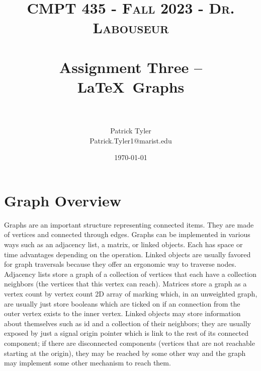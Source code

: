 \documentclass[letterpaper, 10pt]{article}
\title{	
   \normalfont \normalsize 
   \textsc{CMPT 435 - Fall 2023 - Dr. Labouseur} \\[10pt] %
   \horrule{0.5pt} \\[0.25cm] 	%
   \huge Assignment Three -- \LaTeX ~Graphs\\     	    %
   \horrule{0.5pt} \\[0.25cm] 	%
}
\author{Patrick Tyler \\ \normalsize Patrick.Tyler1@marist.edu}
\date{\normalsize\today} 	%
\begin{document}
\maketitle %
\section{Graph Overview}
Graphs are an important structure representing connected items. They are made of vertices and connected through
edges. Graphs can be implemented in various ways such as an adjacency list, a matrix, or linked objects.
Each has space or time advantages depending on the operation. Linked objects are usually favored for
graph traversals because they offer an ergonomic way to traverse nodes. Adjacency lists 
store a graph of a collection of vertices that each have a collection neighbors (the vertices that this vertex can reach).
Matrices store a graph
as a vertex count by vertex count 2D array of marking which, in an unweighted graph, are usually just store
booleans which are ticked on if an connection from the outer vertex exists to the inner vertex. Linked objects
may store information about themselves such as id and a collection of their neighbors; they 
are usually exposed by just a signal origin pointer which is link to the rest of its connected component; if
there are disconnected components (vertices that are not reachable starting at the origin), they may be
reached by some other way and the graph may implement some other mechanism to reach them.
\end{document}
